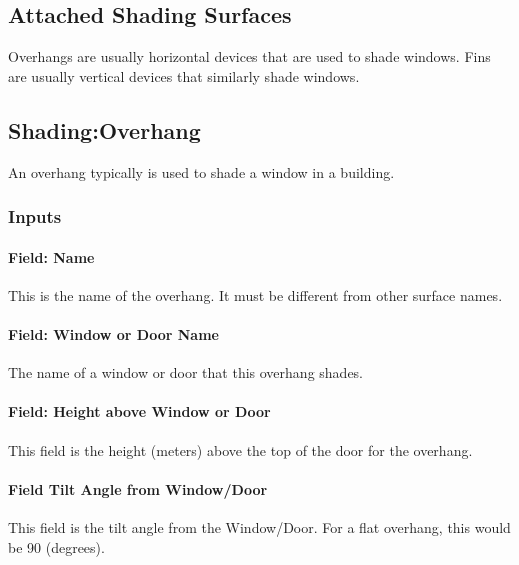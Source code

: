 \subsection{Attached Shading Surfaces}\label{attached-shading-surfaces}

Overhangs are usually horizontal devices that are used to shade windows. Fins are usually vertical devices that similarly shade windows.

\subsection{Shading:Overhang}\label{shadingoverhang}

An overhang typically is used to shade a window in a building.

\subsubsection{Inputs}\label{inputs-26-003}

\paragraph{Field: Name}\label{field-name-24-003}

This is the name of the overhang. It must be different from other surface names.

\paragraph{Field: Window or Door Name}\label{field-window-or-door-name}

The name of a window or door that this overhang shades.

\paragraph{Field: Height above Window or Door}\label{field-height-above-window-or-door}

This field is the height (meters) above the top of the door for the overhang.

\paragraph{Field Tilt Angle from Window/Door}\label{field-tilt-angle-from-windowdoor}

This field is the tilt angle from the Window/Door. For a flat overhang, this would be 90 (degrees).

